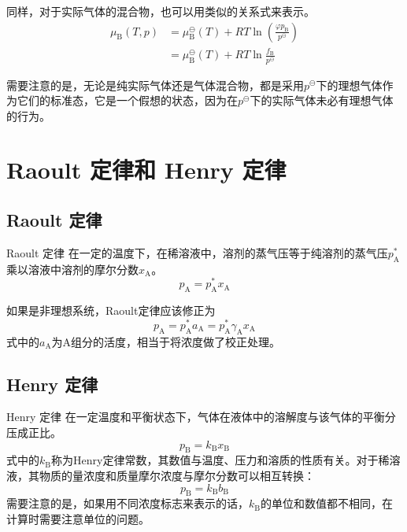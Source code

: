 \documentclass[lang=cn,newtx,10pt,scheme=chinese]{elegantbook}
\begin{document}
同样，对于实际气体的混合物，也可以用类似的关系式来表示。
\begin{equation}
	\begin{aligned}
		\mu_\mathrm{B}(T,p) &=\mu_\mathrm{B}^\ominus(T)+RT\ln \left(\frac{\varphi p_\mathrm{B}}{p^\ominus}\right) \\
		&= \mu_\mathrm{B}^\ominus(T)+RT \ln \frac{f_\mathrm{B}}{p^\ominus}
	\end{aligned}
\end{equation}

需要注意的是，无论是纯实际气体还是气体混合物，都是采用$p^\ominus$下的理想气体作为它们的标准态，它是一个假想的状态，因为在$p^\ominus$下的实际气体未必有理想气体的行为。

\section{Raoult 定律和 Henry 定律}
\subsection{Raoult 定律}
\begin{theorem}{Raoult 定律}
	在一定的温度下，在稀溶液中，溶剂的蒸气压等于纯溶剂的蒸气压$p^*_\mathrm{A}$乘以溶液中溶剂的摩尔分数$x_\mathrm{A}$。
	\begin{equation}
		p_\mathrm{A} = p^*_\mathrm{A}x_\mathrm{A}
	\end{equation}

	如果是非理想系统，Raoult定律应该修正为
	\begin{equation}
		p_\mathrm{A} = p^*_\mathrm{A}a_\mathrm{A} = p^*_\mathrm{A} \gamma_\mathrm{A}x_\mathrm{A}
	\end{equation}
式中的$a_\mathrm{A}$为A组分的活度，相当于将浓度做了校正处理。
\end{theorem}

\subsection{Henry 定律}
\begin{theorem}{Henry 定律}
	在一定温度和平衡状态下，气体在液体中的溶解度与该气体的平衡分压成正比。
	\begin{equation}
		p_\mathrm{B} = k_\mathrm{B}x_\mathrm{B}
	\end{equation}
式中的$k_\mathrm{B}$称为Henry定律常数，其数值与温度、压力和溶质的性质有关。对于稀溶液，其物质的量浓度和质量摩尔浓度与摩尔分数可以相互转换：
	\begin{equation}
	p_\mathrm{B} = k_\mathrm{B}b_\mathrm{B}
	\end{equation}
需要注意的是，如果用不同浓度标志来表示的话，$k_\mathrm{B}$的单位和数值都不相同，在计算时需要注意单位的问题。
\end{theorem}
\end{document}
